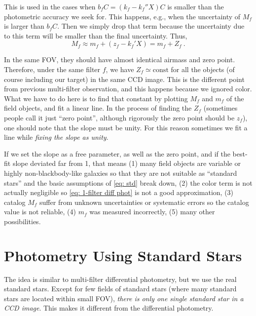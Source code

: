 This is used in the cases when $ b_f C = (k_f - k_f'' X) C $ is smaller than the photometric accuracy we seek for. This happens, e.g., when the uncertainty of $ M_f $ is larger than $ b_f C $. Then we simply drop that term because the uncertainty due to this term will be smaller than the final uncertainty. Thus,
\begin{equation} \label{eq: 1-filter diff phot}
  M_f \approx m_f + (z_f - k_f' X) = m_f + Z_f ~.
\end{equation}

In the same FOV, they should have almost identical airmass and zero point. Therefore, under the same filter $ f $, we have $ Z_f \simeq \mathrm{const} $ for all the objects (of course including our target) in the same CCD image. This is the different point from previous multi-filter observation, and this happens because we ignored color. What we have to do here is to find that constant by plotting $ M_f $ and $ m_f $ of the field objects, and fit a linear line. In the process of finding the $ Z_f $ (sometimes people call it just ``zero point'', although rigorously the zero point should be $ z_f $), one should note that the slope must be unity. For this reason sometimes we fit a line while \textit{fixing the slope as unity}. 

If we set the slope as a free parameter, as well as the zero point, and if the best-fit slope deviated far from 1, that means (1) many field objects are variable or highly non-blackbody-like galaxies so that they are not suitable as ``standard stars'' and the basic assumptions of \cref{eq: std} break down, (2) the color term is not actually negligible so \cref{eq: 1-filter diff phot} is not a good approximation, (3) catalog $ M_f $ suffer from unknown uncertainties or systematic errors so the catalog value is not reliable, (4) $ m_f $ was measured incorrectly, (5) many other possibilities. 


\section{Photometry Using Standard Stars}
The idea is similar to multi-filter differential photometry, but we use the real standard stars. Except for few fields of standard stars (where many standard stars are located within small FOV), \textit{there is only one single standard star in a CCD image}. This makes it different from the differential photometry.

